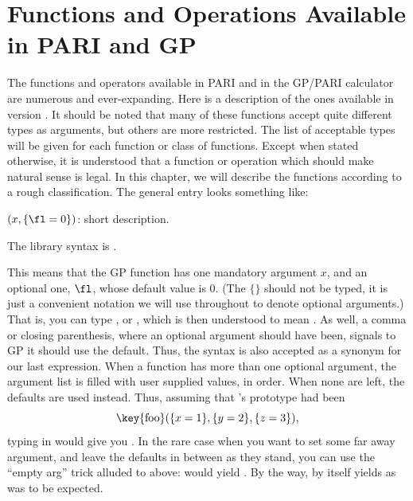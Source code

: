 %
%
\chapter{Functions and Operations Available in PARI and GP}
\label{se:functions}

The functions and operators available in PARI and in the GP/PARI calculator
are numerous and ever-expanding. Here is a description of the ones available
in version \vers. It should be noted that many of these functions accept
quite different types as arguments, but others are more restricted. The list
of acceptable types will be given for each function or class of functions.
Except when stated otherwise, it is understood that a function or operation
which should make natural sense is legal. In this chapter, we will describe
the functions according to a rough classification. The general entry looks
something like:

$(x,\{\fl=0\})$: short description.

The library syntax is .

\noindent
This means that the GP function  has one mandatory argument $x$, and
an optional one, $\fl$, whose default value is 0. (The $\{\}$ should not be
typed, it is just a convenient notation we will use throughout to denote
optional arguments.) That is, you can type , or ,
which is then understood to mean . As well, a comma or closing
parenthesis, where an optional argument should have been, signals to GP it
should use the default. Thus, the syntax  is also accepted as a
synonym for our last expression. When a function has more than one optional
argument, the argument list is filled with user supplied values, in order.
When none are left, the defaults are used instead. Thus, assuming that
's prototype had been
$$\hbox{%
\key{foo}$(\{x=1\},\{y=2\},\{z=3\})$,%
}$$
typing in  would give
you . In the rare case when you want to set some far away
argument, and leave the defaults in between as they stand, you can use the
``empty arg'' trick alluded to above:  would yield
. By the way,  by itself yields
 as was to be expected.

